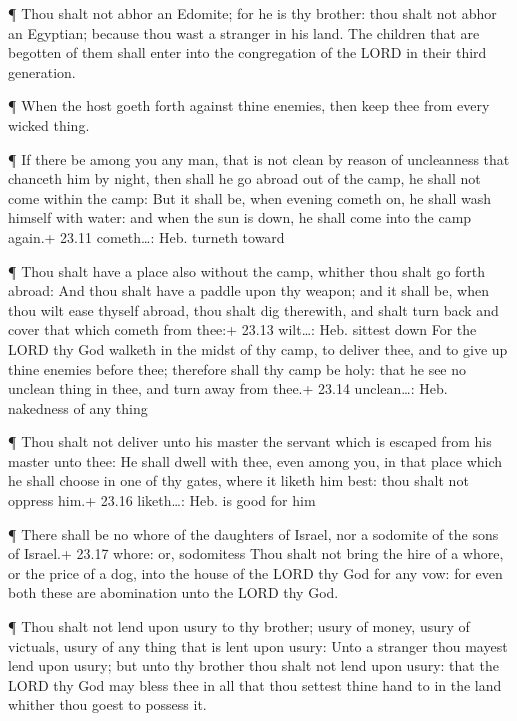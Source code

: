  ¶ Thou shalt not abhor an Edomite; for he is thy brother:
thou shalt not abhor an Egyptian; because thou wast a stranger in his
land.  The children that are begotten of them shall enter
into the congregation of the LORD in their third generation.

 ¶ When the host goeth forth against thine enemies, then
keep thee from every wicked thing.

 ¶ If there be among you any man, that is not clean by
reason of uncleanness that chanceth him by night, then shall he go
abroad out of the camp, he shall not come within the camp: 
But it shall be, when evening cometh on, he shall wash himself with
water: and when the sun is down, he shall come into the camp again.+
23.11 cometh\ldots: Heb. turneth toward

 ¶ Thou shalt have a place also without the camp, whither
thou shalt go forth abroad:  And thou shalt have a paddle
upon thy weapon; and it shall be, when thou wilt ease thyself abroad,
thou shalt dig therewith, and shalt turn back and cover that which
cometh from thee:+ 23.13 wilt\ldots: Heb. sittest down  For
the LORD thy God walketh in the midst of thy camp, to deliver thee, and
to give up thine enemies before thee; therefore shall thy camp be holy:
that he see no unclean thing in thee, and turn away from thee.+ 23.14
unclean\ldots: Heb. nakedness of any thing

 ¶ Thou shalt not deliver unto his master the servant which
is escaped from his master unto thee:  He shall dwell with
thee, even among you, in that place which he shall choose in one of thy
gates, where it liketh him best: thou shalt not oppress him.+ 23.16
liketh\ldots: Heb. is good for him

 ¶ There shall be no whore of the daughters of Israel, nor
a sodomite of the sons of Israel.+ 23.17 whore: or, sodomitess
 Thou shalt not bring the hire of a whore, or the price of
a dog, into the house of the LORD thy God for any vow: for even both
these are abomination unto the LORD thy God.

 ¶ Thou shalt not lend upon usury to thy brother; usury of
money, usury of victuals, usury of any thing that is lent upon usury:
 Unto a stranger thou mayest lend upon usury; but unto thy
brother thou shalt not lend upon usury: that the LORD thy God may bless
thee in all that thou settest thine hand to in the land whither thou
goest to possess it.

